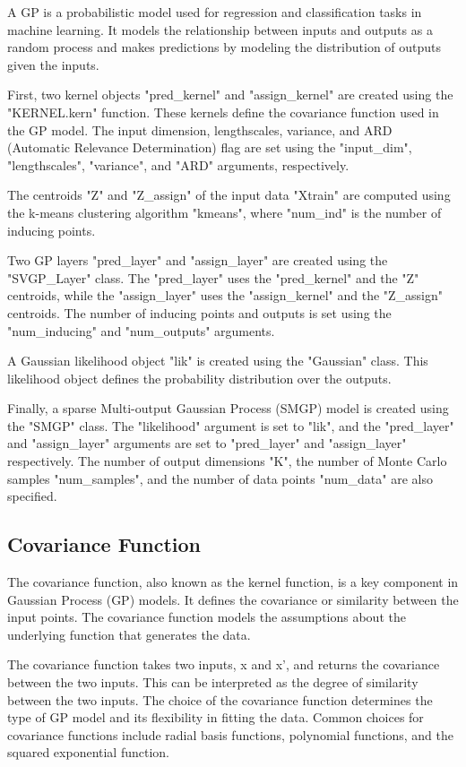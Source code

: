 \documentclass[12pt,a4paper]{report}
\begin{document}
A GP is a probabilistic model used for regression and classification tasks in machine learning. It models the relationship between inputs and outputs as a random process and makes predictions by modeling the distribution of outputs given the inputs.

First, two kernel objects "pred\_kernel" and "assign\_kernel" are created using the "KERNEL.kern" function. These kernels define the covariance function used in the GP model. The input dimension, lengthscales, variance, and ARD (Automatic Relevance Determination) flag are set using the "input\_dim", "lengthscales", "variance", and "ARD" arguments, respectively.

The centroids "Z" and "Z\_assign" of the input data "Xtrain" are computed using the k-means clustering algorithm "kmeans", where "num\_ind" is the number of inducing points.

Two GP layers "pred\_layer" and "assign\_layer" are created using the "SVGP\_Layer" class. The "pred\_layer" uses the "pred\_kernel" and the "Z" centroids, while the "assign\_layer" uses the "assign\_kernel" and the "Z\_assign" centroids. The number of inducing points and outputs is set using the "num\_inducing" and "num\_outputs" arguments.

A Gaussian likelihood object "lik" is created using the "Gaussian" class. This likelihood object defines the probability distribution over the outputs.

Finally, a sparse Multi-output Gaussian Process (SMGP) model is created using the "SMGP" class. The "likelihood" argument is set to "lik", and the "pred\_layer" and "assign\_layer" arguments are set to "pred\_layer" and "assign\_layer" respectively. The number of output dimensions "K", the number of Monte Carlo samples "num\_samples", and the number of data points "num\_data" are also specified.

\subsection{Covariance Function}

The covariance function, also known as the kernel function, is a key component in Gaussian Process (GP) models. It defines the covariance or similarity between the input points. The covariance function models the assumptions about the underlying function that generates the data.

The covariance function takes two inputs, x and x', and returns the covariance between the two inputs. This can be interpreted as the degree of similarity between the two inputs. The choice of the covariance function determines the type of GP model and its flexibility in fitting the data. Common choices for covariance functions include radial basis functions, polynomial functions, and the squared exponential function.
\end{document}
